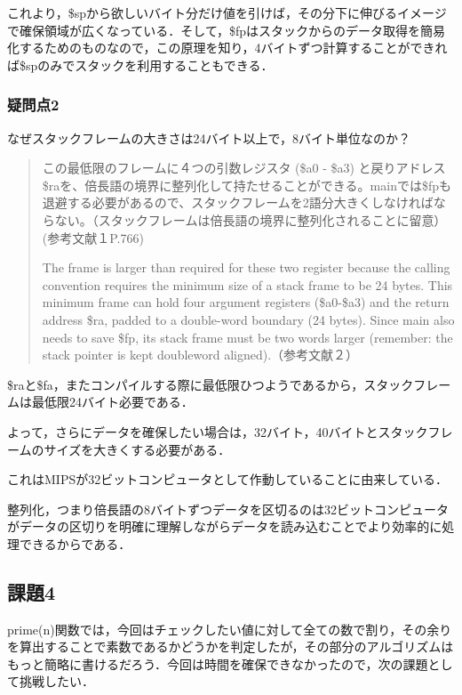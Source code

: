 \documentclass[a4j]{jarticle}
\begin{document}
これより，\$spから欲しいバイト分だけ値を引けば，その分下に伸びるイメージで確保領域が広くなっている．そして，\$fpはスタックからのデータ取得を簡易化するためのものなので，この原理を知り，4バイトずつ計算することができれば\$spのみでスタックを利用することもできる．

\subsubsection{疑問点2}

なぜスタックフレームの大きさは24バイト以上で，8バイト単位なのか？  

\begin{quote}
この最低限のフレームに４つの引数レジスタ (\$a0 - \$a3) と戻りアドレス\$raを、倍長語の境界に整列化して持たせることができる。mainでは\$fpも退避する必要があるので、スタックフレームを2語分大きくしなければならない。（スタックフレームは倍長語の境界に整列化されることに留意）(参考文献１P.766)

The frame is larger than required for these two register because the calling convention requires the minimum size of a stack frame to be 24 bytes. This minimum frame can hold four argument registers (\$a0-\$a3) and the return address \$ra, padded to a double-word boundary (24 bytes). Since main also needs to save \$fp, its stack frame must be two words larger (remember: the stack pointer is kept doubleword aligned).（参考文献２）
\end{quote}

\$raと\$fa，またコンパイルする際に最低限ひつようであるから，スタックフレームは最低限24バイト必要である．

よって，さらにデータを確保したい場合は，32バイト，40バイトとスタックフレームのサイズを大きくする必要がある．

これはMIPSが32ビットコンピュータとして作動していることに由来している．

整列化，つまり倍長語の8バイトずつデータを区切るのは32ビットコンピュータがデータの区切りを明確に理解しながらデータを読み込むことでより効率的に処理できるからである．




\subsection{課題4}

prime(n)関数では，今回はチェックしたい値に対して全ての数で割り，その余りを算出することで素数であるかどうかを判定したが，その部分のアルゴリズムはもっと簡略に書けるだろう．今回は時間を確保できなかったので，次の課題として挑戦したい．
\end{document}
